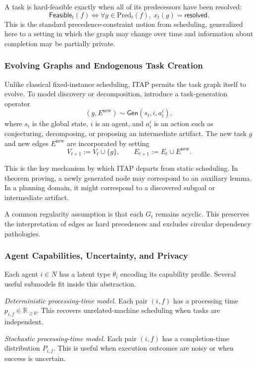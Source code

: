 A task is hard-feasible exactly when all of its predecessors have been resolved:
\[
  \mathsf{Feasible}_t(f)
  \iff
  \forall g \in \mathrm{Pred}_t(f), \ x_t(g)=\mathsf{resolved}.
\]
This is the standard precedence-constraint notion from scheduling, generalized here to a setting in which the graph may change over time and information about completion may be partially private.

\subsubsection{Evolving Graphs and Endogenous Task Creation}

Unlike classical fixed-instance scheduling, ITAP permits the task graph itself to evolve. To model discovery or decomposition, introduce a task-generation operator
\[
  (g, E^{\mathrm{new}}) \sim \mathsf{Gen}(s_t, i, a_t^i),
\]
where \(s_t\) is the global state, \(i\) is an agent, and \(a_t^i\) is an action such as conjecturing, decomposing, or proposing an intermediate artifact. The new task \(g\) and new edges \(E^{\mathrm{new}}\) are incorporated by setting
\[
  V_{t+1} := V_t \cup \{g\},
  \qquad
  E_{t+1} := E_t \cup E^{\mathrm{new}}.
\]

This is the key mechanism by which ITAP departs from static scheduling. In theorem proving, a newly generated node may correspond to an auxiliary lemma. In a planning domain, it might correspond to a discovered subgoal or intermediate artifact.

A common regularity assumption is that each \(G_t\) remains acyclic. This preserves the interpretation of edges as hard precedences and excludes circular dependency pathologies.

\subsubsection{Agent Capabilities, Uncertainty, and Privacy}

Each agent \(i \in N\) has a latent type \(\theta_i\) encoding its capability profile. Several useful submodels fit inside this abstraction.

\textit{Deterministic processing-time model.}
Each pair \((i,f)\) has a processing time \(p_{i,f} \in \mathbb{R}_{\ge 0}\). This recovers unrelated-machine scheduling when tasks are independent.

\textit{Stochastic processing-time model.}
Each pair \((i,f)\) has a completion-time distribution \(P_{i,f}\). This is useful when execution outcomes are noisy or when success is uncertain.

